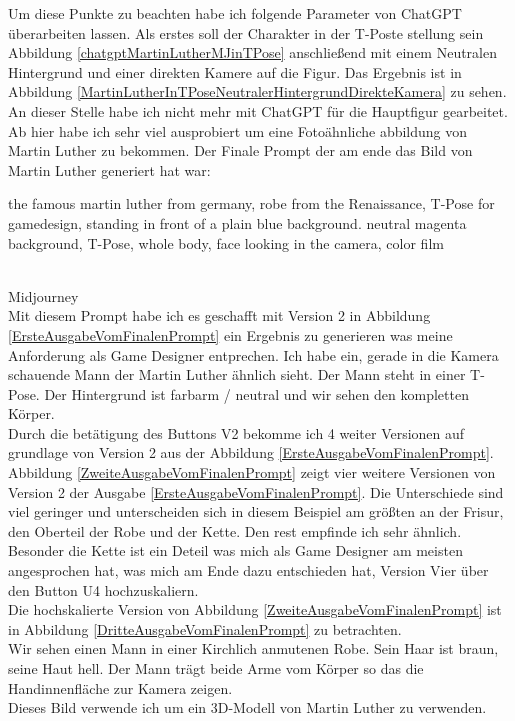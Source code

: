Um diese Punkte zu beachten habe ich folgende Parameter von ChatGPT überarbeiten lassen. Als erstes soll der Charakter in der T-Poste stellung sein Abbildung \ref{chatgptMartinLutherMJinTPose} anschließend mit einem Neutralen Hintergrund und einer direkten Kamere auf die Figur. Das Ergebnis ist in Abbildung \ref{MartinLutherInTPoseNeutralerHintergrundDirekteKamera} zu sehen.
\\
An dieser Stelle habe ich nicht mehr mit ChatGPT für die Hauptfigur gearbeitet. Ab hier habe ich sehr viel ausprobiert um eine Fotoähnliche abbildung von Martin Luther zu bekommen. Der Finale Prompt der am ende das Bild von Martin Luther generiert hat war:
\\
\rmfamily
\begin{large}
	the famous martin luther from germany, robe from the Renaissance, T-Pose for gamedesign, standing in front of a plain blue background. neutral magenta background, T-Pose, whole body, face looking in the camera, color film
\end{large}
\sffamily
\\
Midjourney
\\
Mit diesem Prompt habe ich es geschafft mit Version 2 in Abbildung \ref{ErsteAusgabeVomFinalenPrompt} ein Ergebnis zu generieren was meine Anforderung als Game Designer entprechen. Ich habe ein, gerade in die Kamera schauende Mann der Martin Luther ähnlich sieht. Der Mann steht in einer T-Pose. Der Hintergrund ist farbarm / neutral und wir sehen den kompletten Körper.
\\
Durch die betätigung des Buttons V2 bekomme ich 4 weiter Versionen auf grundlage von Version 2 aus der Abbildung \ref{ErsteAusgabeVomFinalenPrompt}.
\\
Abbildung \ref{ZweiteAusgabeVomFinalenPrompt} zeigt vier weitere Versionen von Version 2 der Ausgabe \ref{ErsteAusgabeVomFinalenPrompt}. Die Unterschiede sind viel geringer und unterscheiden sich in diesem Beispiel am größten an der Frisur, den Oberteil der Robe und der Kette. Den rest empfinde ich sehr ähnlich.
\\
Besonder die Kette ist ein Deteil was mich als Game Designer am meisten angesprochen hat, was mich am Ende dazu entschieden hat, Version Vier über den Button U4 hochzuskaliern.
\\
Die hochskalierte Version von Abbildung \ref{ZweiteAusgabeVomFinalenPrompt} ist in Abbildung \ref{DritteAusgabeVomFinalenPrompt} zu betrachten.
\\
Wir sehen einen Mann in einer Kirchlich anmutenen Robe. Sein Haar ist braun, seine Haut hell. Der Mann trägt beide Arme vom Körper so das die Handinnenfläche zur Kamera zeigen.
\\
Dieses Bild verwende ich um ein 3D-Modell von Martin Luther zu verwenden.
